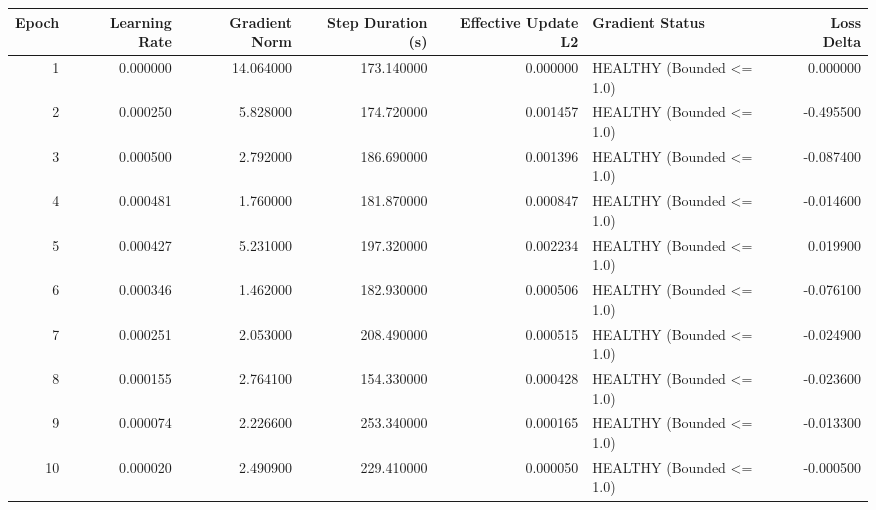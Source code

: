 \begin{tabular}{rrrrrlr}
\toprule
Epoch & Learning Rate & Gradient Norm & Step Duration (s) & Effective Update L2 & Gradient Status & Loss Delta \\
\midrule
1 & 0.000000 & 14.064000 & 173.140000 & 0.000000 & HEALTHY (Bounded <= 1.0) & 0.000000 \\
2 & 0.000250 & 5.828000 & 174.720000 & 0.001457 & HEALTHY (Bounded <= 1.0) & -0.495500 \\
3 & 0.000500 & 2.792000 & 186.690000 & 0.001396 & HEALTHY (Bounded <= 1.0) & -0.087400 \\
4 & 0.000481 & 1.760000 & 181.870000 & 0.000847 & HEALTHY (Bounded <= 1.0) & -0.014600 \\
5 & 0.000427 & 5.231000 & 197.320000 & 0.002234 & HEALTHY (Bounded <= 1.0) & 0.019900 \\
6 & 0.000346 & 1.462000 & 182.930000 & 0.000506 & HEALTHY (Bounded <= 1.0) & -0.076100 \\
7 & 0.000251 & 2.053000 & 208.490000 & 0.000515 & HEALTHY (Bounded <= 1.0) & -0.024900 \\
8 & 0.000155 & 2.764100 & 154.330000 & 0.000428 & HEALTHY (Bounded <= 1.0) & -0.023600 \\
9 & 0.000074 & 2.226600 & 253.340000 & 0.000165 & HEALTHY (Bounded <= 1.0) & -0.013300 \\
10 & 0.000020 & 2.490900 & 229.410000 & 0.000050 & HEALTHY (Bounded <= 1.0) & -0.000500 \\
\bottomrule
\end{tabular}
